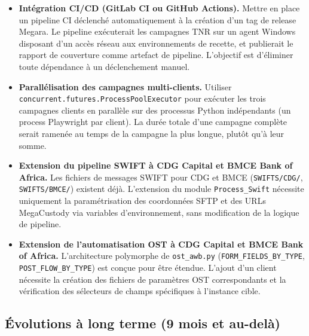 \documentclass[12pt, a4paper]{report}
\begin{document}
\begin{itemize}[itemsep=3pt]

  \item \textbf{Intégration CI/CD (GitLab CI ou GitHub Actions).}
  Mettre en place un pipeline CI déclenché automatiquement à la création d'un tag de release Megara. Le pipeline exécuterait les campagnes TNR sur un agent Windows disposant d'un accès réseau aux environnements de recette, et publierait le rapport de couverture comme artefact de pipeline. L'objectif est d'éliminer toute dépendance à un déclenchement manuel.

  \item \textbf{Parallélisation des campagnes multi-clients.}
  Utiliser \texttt{concurrent.futures.\allowbreak{}ProcessPoolExecutor} pour exécuter les trois campagnes clients en parallèle sur des processus Python indépendants (un process Playwright par client). La durée totale d'une campagne complète serait ramenée au temps de la campagne la plus longue, plutôt qu'à leur somme.

  \item \textbf{Extension du pipeline SWIFT à CDG Capital et BMCE Bank of Africa.}
  Les fichiers de messages SWIFT pour CDG et BMCE (\texttt{SWIFTS/CDG/}, \texttt{SWIFTS/BMCE/}) existent déjà. L'extension du module \texttt{Process\_Swift} nécessite uniquement la paramétrisation des coordonnées SFTP et des URLs MegaCustody via variables d'environnement, sans modification de la logique de pipeline.

  \item \textbf{Extension de l'automatisation OST à CDG Capital et BMCE Bank of Africa.}
  L'architecture polymorphe de \texttt{ost\_awb.py} (\texttt{FORM\_FIELDS\_BY\_TYPE}, \texttt{POST\_FLOW\_BY\_TYPE}) est conçue pour être étendue. L'ajout d'un client nécessite la création des fichiers de paramètres OST correspondants et la vérification des sélecteurs de champs spécifiques à l'instance cible.

\end{itemize}

\subsection*{Évolutions à long terme (9 mois et au-delà)}
\end{document}
